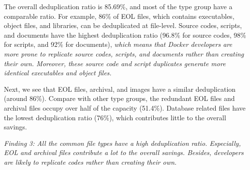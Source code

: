 The overall deduplication ratio is 85.69\%, and most of the type group have a
comparable ratio. For example, 86\% of EOL files, which contains executables,
object files, and libraries, can be deduplicated at file-level.  Source codes,
scripts, and documents have the highest deduplication ratio (96.8\% for source
codes, 98\% for scripts, and 92\% for documents), \textit{which means that
Docker developers are more prone to replicate source codes, scripts, and
documents rather than creating their own. Moreover, these source code and
script duplicates generate more identical executables and object files.} 

%

Next, we see that EOL files, archival, and images have a similar deduplication
(around 86\%). Compare with other type groups, the redundant EOL files and
archival files occupy over half of the capacity (51.4\%). 
Database related files have the lowest deduplication ratio (76\%), which
contributes little to the overall savings.

\textit{Finding 3: All the common file types have a high deduplication ratio.
Especially, EOL and archival files contribute a lot to the overall savings.
Besides, developers are likely to replicate codes rather than creating their
own.}

